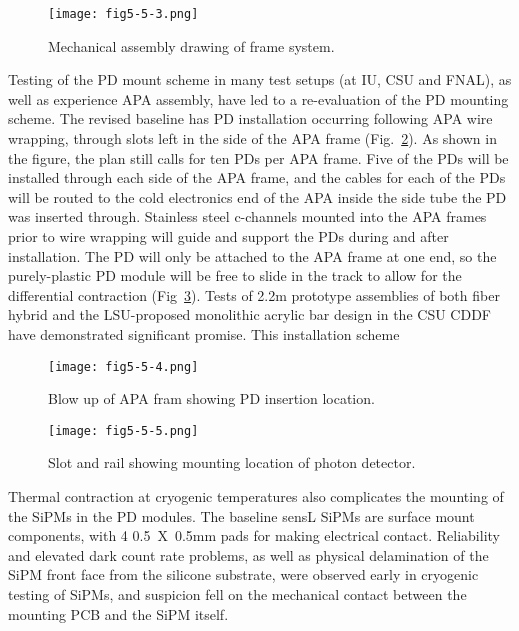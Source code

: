 \begin{figure}[h!]
  \centering
  \texttt{[image: fig5-5-3.png]}
\caption{Mechanical assembly drawing of frame system.}
\label{fig5.5-3}
\end{figure}

Testing of the PD mount scheme in many test setups (at IU, CSU and
FNAL), as well as experience APA assembly, have led to a re-evaluation
of the PD mounting scheme.  The revised baseline has PD installation
occurring following APA wire wrapping, through slots left in the side
of the APA frame (Fig.~\ref{fig5.5-4}).  As shown in the figure, the
plan still calls for ten PDs per APA frame.  Five of the PDs will be
installed through each side of the APA frame, and the cables for each
of the PDs will be routed to the cold electronics end of the APA
inside the side tube the PD was inserted through.  Stainless steel
c-channels mounted into the APA frames prior to wire wrapping will
guide and support the PDs during and after installation.  The PD will
only be attached to the APA frame at one end, so the purely-plastic PD
module will be free to slide in the track to allow for the
differential contraction (Fig~\ref{fig5.5-5}).  Tests of 2.2m prototype
assemblies of both fiber hybrid and the LSU-proposed monolithic
acrylic bar design in the CSU CDDF have demonstrated significant
promise.  This installation scheme

\begin{figure}[h!]
  \centering
  \texttt{[image: fig5-5-4.png]}
\caption{Blow up of APA fram showing PD insertion location.}
\label{fig5.5-4}
\end{figure}

\begin{figure}[h!]
  \centering
  \texttt{[image: fig5-5-5.png]}
\caption{Slot and rail showing mounting location of photon detector.}
\label{fig5.5-5}
\end{figure}

Thermal contraction at cryogenic temperatures also complicates the
mounting of the SiPMs in the PD modules.  The baseline sensL SiPMs are
surface mount components, with 4 0.5~X~0.5mm pads for making
electrical contact.  Reliability and elevated dark count rate
problems, as well as physical delamination of the SiPM front face from
the silicone substrate, were observed early in cryogenic testing of
SiPMs, and suspicion fell on the mechanical contact between the
mounting PCB and the SiPM itself.

